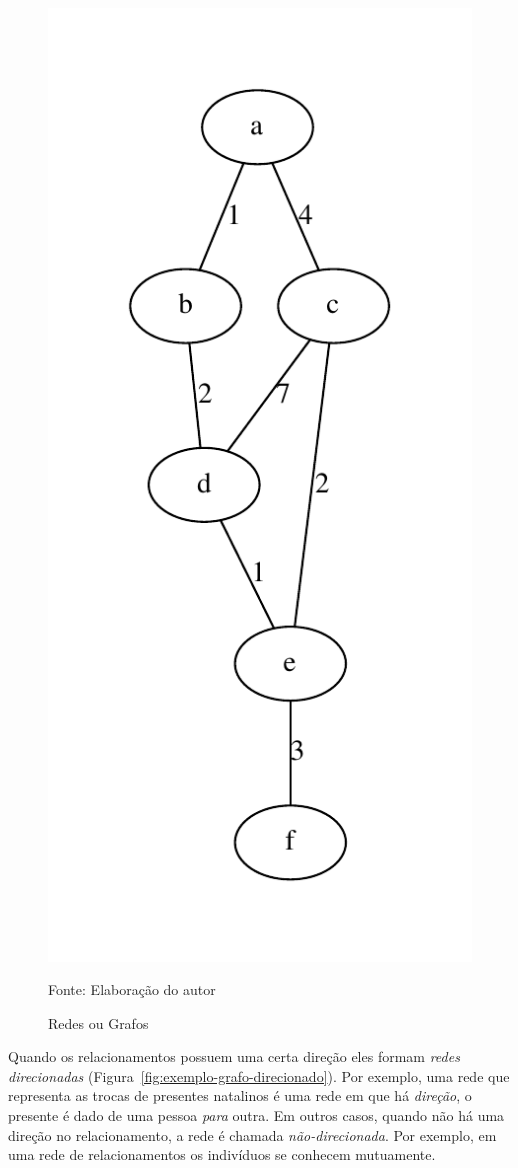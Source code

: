 \documentclass[12pt,a4paper,final]{article}
\newcommand{\source}[1]{\vspace{-10pt} \caption*{Fonte: {#1}} }
\begin{document}
\begin{figure}[ht]
{        \includegraphics[scale=0.44]{weighted.pdf}
        \label{fig:exemplo-grafo-ponderado}
    }    
    \caption{Redes ou Grafos}
    \label{fig:exemplo-tipos-grafo}
    \source{Elaboração do autor}
\end{figure}

Quando os relacionamentos possuem uma certa direção eles formam \textit{redes direcionadas} (Figura~\ref{fig:exemplo-grafo-direcionado}). Por exemplo, uma rede que representa as trocas de presentes natalinos é uma rede em que há \textit{direção}, o presente é dado de uma pessoa \textit{para} outra. Em outros casos, quando não há uma direção no relacionamento, a rede é chamada \textit{não-direcionada}. Por exemplo, em uma rede de relacionamentos os indivíduos se conhecem mutuamente. 
\end{document}
